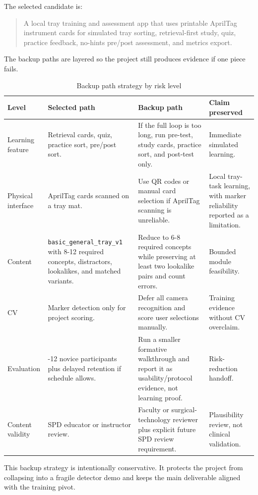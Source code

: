 \documentclass[10pt,a4paper]{article}
\begin{document}
The selected candidate is:
\begin{quote}
A local tray training and assessment app that uses printable AprilTag
instrument cards for simulated tray sorting, retrieval-first study, quiz,
practice feedback, no-hints pre/post assessment, and metrics export.
\end{quote}
The backup paths are layered so the project still produces evidence if one
piece fails.
\begin{table}[H]
\centering
\caption{Backup path strategy by risk level}
\label{tab:backup-path-strategy-by-risk-level}
\small\renewcommand{\arraystretch}{1.2}\setlength{\tabcolsep}{4pt}
\begin{tabularx}{\textwidth}{|>{\raggedright\arraybackslash}X|>{\raggedright\arraybackslash}X|>{\raggedright\arraybackslash}X|>{\raggedright\arraybackslash}X|}
\hline
Level & Selected path & Backup path & Claim preserved \\
\hline
Learning feature & Retrieval cards, quiz, practice sort, pre/post sort. & If the full loop is too long, run pre-test, study cards, practice sort, and post-test only. & Immediate simulated learning. \\
\hline
Physical interface & AprilTag cards scanned on a tray mat. & Use QR codes or manual card selection if AprilTag scanning is unreliable. & Local tray-task learning, with marker reliability reported as a limitation. \\
\hline
Content & \texttt{basic\_general\_tray\_v1} with 8-12 required concepts, distractors, lookalikes, and matched variants. & Reduce to 6-8 required concepts while preserving at least two lookalike pairs and count errors. & Bounded module feasibility. \\
\hline
CV & Marker detection only for project scoring. & Defer all camera recognition and score user selections manually. & Training evidence without CV overclaim. \\
\hline
Evaluation & 8-12 novice participants plus delayed retention if schedule allows. & Run a smaller formative walkthrough and report it as usability/protocol evidence, not learning proof. & Risk-reduction handoff. \\
\hline
Content validity & SPD educator or instructor review. & Faculty or surgical-technology reviewer plus explicit future SPD review requirement. & Plausibility review, not clinical validation. \\
\hline
\end{tabularx}
\end{table}
This backup strategy is intentionally conservative. It protects the project from
collapsing into a fragile detector demo and keeps the main deliverable aligned
with the training pivot.
\end{document}
